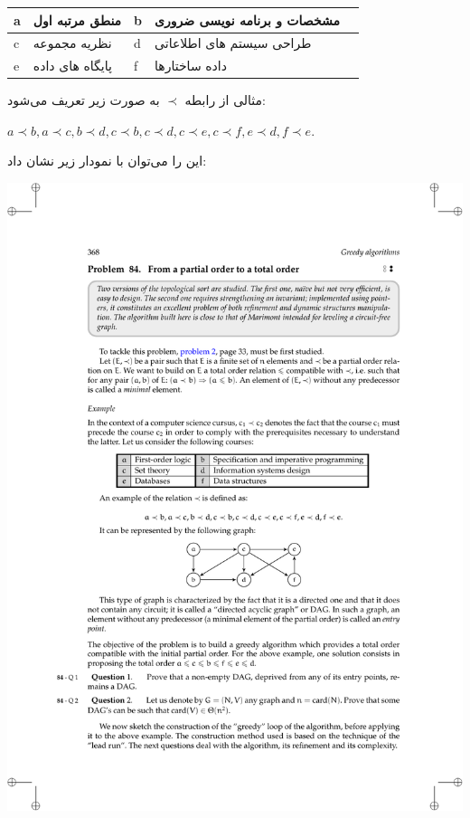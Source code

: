 \documentclass{book} %
\newcommand{\imgcaption}[1]{\color[HTML]{4F4D4D}\footnotesize{#1}}
\begin{document}
\begin{tabularx}{0.8\textwidth} { 
    | >{\arraybackslash\arraybackslash}X 
    | >{\centering\arraybackslash}X 
    | >{\raggedleft\arraybackslash}X 
    | >{\raggedleft\arraybackslash}X
    | >{\raggedleft\arraybackslash}X |}
   \hline
   a & منطق مرتبه اول & b & مشخصات و برنامه نویسی ضروری \\
   \hline
   c & نظریه مجموعه & d &  طراحی سیستم های اطلاعاتی \\
  \hline
   e & پایگاه های داده & f & داده ساختارها \\
  \hline
\end{tabularx}


مثالی از رابطه $\prec$ به صورت زیر تعریف می‌شود:

$a \prec b, a \prec c, b \prec d, c \prec b, c \prec d, c \prec e, c \prec f, e \prec d, f \prec e$.

این را می‌توان با نمودار زیر نشان داد:

\begin{center}
    \includegraphics{./fig7.10.pdf}

\end{center}
\end{document}
